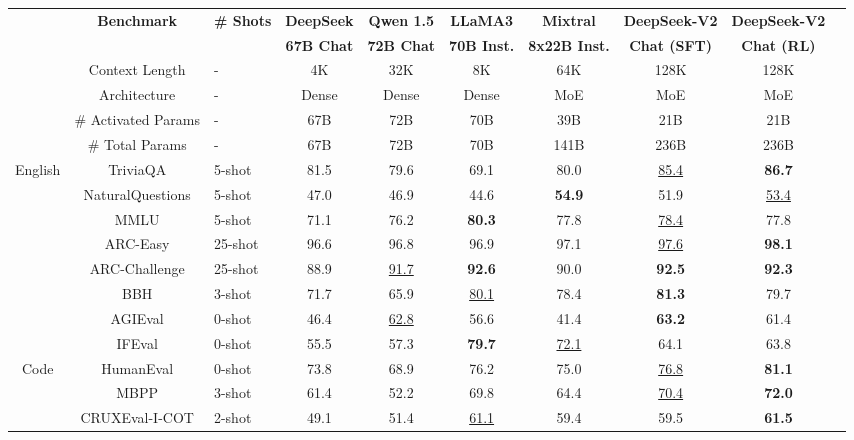 \documentclass[11pt, a4paper, logo, copyright, nonumbering]{deepseek}
\begin{document}
\begin{CJK*}{UTF8}{gbsn}
\begin{table}[!t]
    \centering
    \footnotesize
    \setlength{\tabcolsep}{2pt}
    \begin{tabular}{@{}c c l c | cc c |c c c@{}}
    \toprule
    & \multirow{2}{*}{\centering \textbf{Benchmark}} & \multirow{2}{*}{\textbf{\# Shots}} & \textbf{DeepSeek} & \textbf{Qwen 1.5} & \textbf{LLaMA3} & \textbf{Mixtral} & \textbf{DeepSeek-V2} & \textbf{DeepSeek-V2} \\
    & & & \textbf{67B Chat} & \textbf{72B Chat} & \textbf{70B Inst.} & \textbf{8x22B Inst.} & \textbf{Chat (SFT)} & \textbf{Chat (RL)} \\
    \midrule
    & Context Length & - & 4K & 32K & 8K & 64K & 128K & 128K\\
    & Architecture & - & Dense & Dense & Dense & MoE & MoE & MoE\\
    & \# Activated Params & - & 67B & 72B & 70B & 39B & 21B & 21B \\
    & \# Total Params & - & 67B & 72B & 70B & 141B & 236B & 236B \\
    \midrule
    \multirow{8}{*}{English} & TriviaQA & 5-shot & 81.5 & 79.6 & 69.1 & 80.0 & \underline{85.4} & \textbf{86.7} \\
    & NaturalQuestions & 5-shot & 47.0 & 46.9 & 44.6 & \textbf{54.9} & 51.9 & \underline{53.4} \\
    & MMLU & 5-shot & 71.1 & 76.2 & \textbf{80.3} & 77.8 & \underline{78.4} & 77.8 \\
    & ARC-Easy & 25-shot & 96.6 & 96.8 & 96.9 & 97.1 & \underline{97.6} &  \textbf{98.1} \\
    & ARC-Challenge & 25-shot & 88.9 & \underline{91.7} & \textbf{92.6} & 90.0 & \textbf{92.5} & \textbf{92.3} \\
    & BBH & 3-shot & 71.7 & 65.9 & \underline{80.1} & 78.4 & \textbf{81.3} & 79.7 \\
    & AGIEval & 0-shot & 46.4 & \underline{62.8} & 56.6 & 41.4 & \textbf{63.2} & 61.4 \\
    & IFEval & 0-shot & 55.5 & 57.3 & \textbf{79.7} & \underline{72.1} & 64.1 & 63.8 \\
    \midrule
    \multirow{4}{*}{Code} & HumanEval & 0-shot & 73.8 & 68.9 & 76.2 & 75.0 & \underline{76.8} & \textbf{81.1} \\
    & MBPP & 3-shot & 61.4 & 52.2 & 69.8 & 64.4 & \underline{70.4} & \textbf{72.0} \\
    & CRUXEval-I-COT & 2-shot & 49.1 & 51.4 & \underline{61.1} & 59.4 & 59.5 & \textbf{61.5} \\

\end{tabular}
\end{table}
\end{CJK*}
\end{document}
